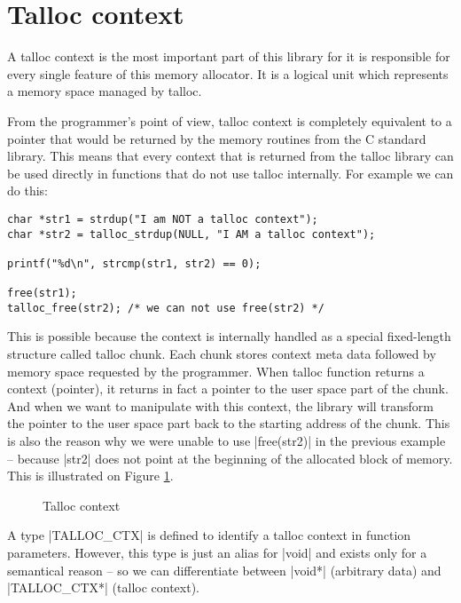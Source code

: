 \section{Talloc context}
\label{talloc:sec:context}

A talloc context is the most important part of this library for it is
responsible for every single feature of this memory allocator. It is a logical
unit which represents a memory space managed by talloc.

From the programmer's point of view, talloc context is completely equivalent to
a pointer that would be returned by the memory routines from the C standard
library. This means that every context that is returned from the talloc library
can be used directly in functions that do not use talloc internally. For
example we can do this:

\begin{lstlisting}
char *str1 = strdup("I am NOT a talloc context");
char *str2 = talloc_strdup(NULL, "I AM a talloc context");

printf("%d\n", strcmp(str1, str2) == 0);

free(str1);
talloc_free(str2); /* we can not use free(str2) */
\end{lstlisting}

This is possible because the context is internally handled as a special
fixed-length structure called talloc chunk. Each chunk stores context meta data
followed by memory space requested by the programmer. When talloc function
returns a context (pointer), it returns in fact a pointer to the user space
part of the chunk. And when we want to manipulate with this context, the
library will transform the pointer to the user space part back to the starting
address of the chunk. This is also the reason why we were unable to use
|free(str2)| in the previous example -- because |str2| does not point at the
beginning of the allocated block of memory. This is illustrated on Figure
\ref{fig:talloc-context}.

\begin{figure}[H]
  \centering
  
  \caption{Talloc context}
  \label{fig:talloc-context}
\end{figure}

A type |TALLOC_CTX| is defined to identify a talloc context in function
parameters. However, this type is just an alias for |void| and exists only
for a semantical reason -- so we can differentiate between |void*| (arbitrary
data) and |TALLOC_CTX*| (talloc context).

